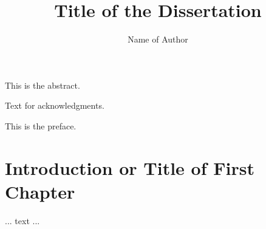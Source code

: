 \documentclass[12pt]{template/nuthesis}
\author{Name of Author}
\title{Title of the Dissertation}
\begin{document}
%	
%


\frontmatter		%

\maketitle		%

\copyrightpage		%


\abstract		%

This is the abstract.

\acknowledgements	%

Text for acknowledgments.

\preface		%

This is the preface.


%
%
%
%
%
%
%
%

\clearpage{} %
\tableofcontents	%

\clearpage{} %
\listoftables		%

\clearpage{} %
\listoffigures		%



\mainmatter             %



\chapter{Introduction or Title of First Chapter}	%
	... text ...		%
\end{document}
